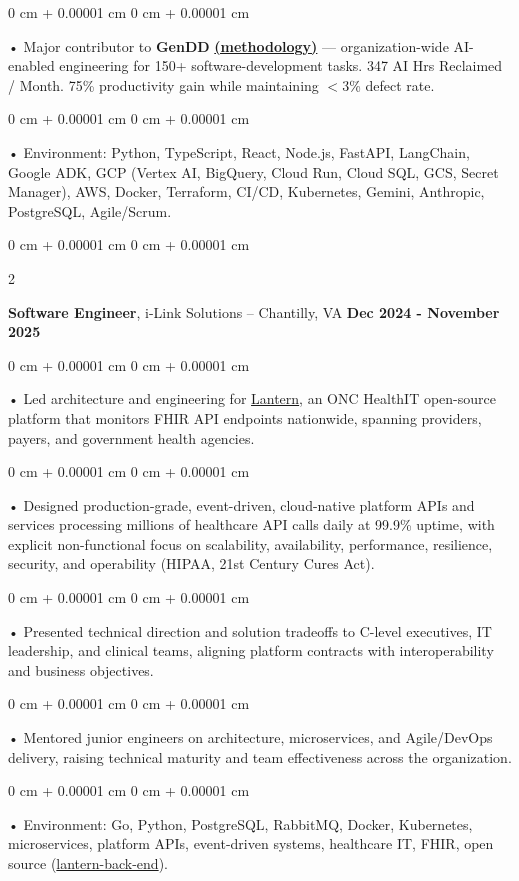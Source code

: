 \documentclass[10pt, letterpaper]{article}
\newenvironment{onecolentry}{
    \begin{adjustwidth}{
        0 cm + 0.00001 cm
    }{
        0 cm + 0.00001 cm
    }
}{
    \end{adjustwidth}
} %
\newenvironment{twocolentry}[2][]{
    \onecolentry
    \def\secondColumn{#2}
    \setcolumnwidth{\fill, 4.5 cm}
    \begin{paracol}{2}
}{
    \switchcolumn \raggedleft \secondColumn
    \end{paracol}
    \endonecolentry
} %
\begin{document}
        \begin{onecolentry}
             • Major contributor to \textbf{GenDD} \href{https://hatchworks.com/generative-driven-development/}{\textbf{(methodology)}} --- organization-wide AI-enabled engineering for 150+ software-development tasks. 347 AI Hrs Reclaimed / Month. 75\% productivity gain while maintaining $<$3\% defect rate.
        \end{onecolentry}
        \begin{onecolentry}
             • Environment: Python, TypeScript, React, Node.js, FastAPI, LangChain, Google ADK, GCP (Vertex AI, BigQuery, Cloud Run, Cloud SQL, GCS, Secret Manager), AWS, Docker, Terraform, CI/CD, Kubernetes, Gemini, Anthropic, PostgreSQL, Agile/Scrum.
        \end{onecolentry}

        \vspace{0.1cm}

        \begin{twocolentry}{
            \textbf{Dec 2024 - November 2025}
        }
            \textbf{Software Engineer}, i-Link Solutions -- Chantilly, VA\end{twocolentry}


        \begin{onecolentry}
             • Led architecture and engineering for \href{https://lantern.healthit.gov/?tab=dashboard_tab}{Lantern}, an ONC HealthIT open-source platform that monitors FHIR API endpoints nationwide, spanning providers, payers, and government health agencies.
        \end{onecolentry}
        \begin{onecolentry}
             • Designed production-grade, event-driven, cloud-native platform APIs and services processing millions of healthcare API calls daily at 99.9\% uptime, with explicit non-functional focus on scalability, availability, performance, resilience, security, and operability (HIPAA, 21st Century Cures Act).
        \end{onecolentry}
        \begin{onecolentry}
             • Presented technical direction and solution tradeoffs to C-level executives, IT leadership, and clinical teams, aligning platform contracts with interoperability and business objectives.
        \end{onecolentry}
        \begin{onecolentry}
             • Mentored junior engineers on architecture, microservices, and Agile/DevOps delivery, raising technical maturity and team effectiveness across the organization.
        \end{onecolentry}
        \begin{onecolentry}
             • Environment: Go, Python, PostgreSQL, RabbitMQ, Docker, Kubernetes, microservices, platform APIs, event-driven systems, healthcare IT, FHIR, open source (\href{https://github.com/onc-healthit/lantern-back-end}{lantern-back-end}).
        \end{onecolentry}
        \vspace{0.1cm}
\end{document}
